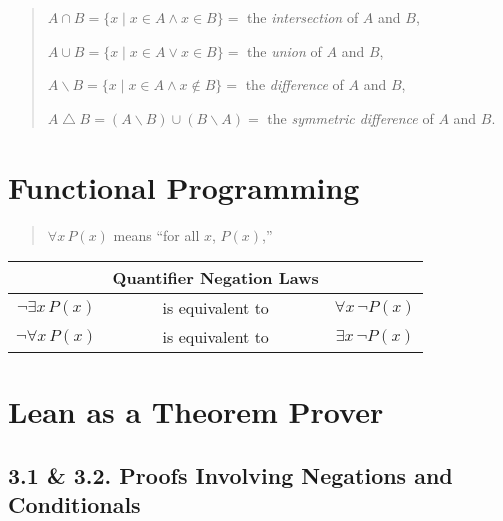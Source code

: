 \documentclass[
  letterpaper,
  DIV=11,
  numbers=noendperiod]{scrreprt}
\newcommand{\setmin}{\mathbin{\backslash}}
\newcommand{\symmdiff}{\bigtriangleup}
\theoremstyle{remark}
\begin{document}
\begin{quote}
\(A \cap B = \{x \mid x \in A \wedge x \in B\} = {}\) the
\emph{intersection} of \(A\) and \(B\),

\(A \cup B = \{x \mid x \in A \vee x \in B\} = {}\) the \emph{union} of
\(A\) and \(B\),

\(A \setmin B = \{x \mid x \in A \wedge x \notin B\} = {}\) the
\emph{difference} of \(A\) and \(B\),

\(A \symmdiff B = (A \setmin B) \cup (B \setmin A) = {}\) the
\emph{symmetric difference} of \(A\) and \(B\).

\end{quote}


\hypertarget{functional-programming}{%
\chapter{Functional Programming}\label{functional-programming}}

\begin{quote}
\(\forall x\,P(x)\) means ``for all \(x\), \(P(x)\),''

\end{quote}

\begin{longtable}[]{@{}ccc@{}}
\toprule\noalign{}
& Quantifier Negation Laws & \\
\midrule\noalign{}
\endhead
\bottomrule\noalign{}
\endlastfoot
\(\neg \exists x\,P(x)\) & is equivalent to &
\(\forall x\,\neg P(x)\) \\
\(\neg \forall x\,P(x)\) & is equivalent to &
\(\exists x\,\neg P(x)\) \\
\end{longtable}


\hypertarget{lean-as-a-theorem-prover}{%
\chapter{Lean as a Theorem Prover}\label{lean-as-a-theorem-prover}}

\hypertarget{proofs-involving-negations-and-conditionals}{%
\section{3.1 \& 3.2. Proofs Involving Negations and
Conditionals}\label{proofs-involving-negations-and-conditionals}}
\end{document}
